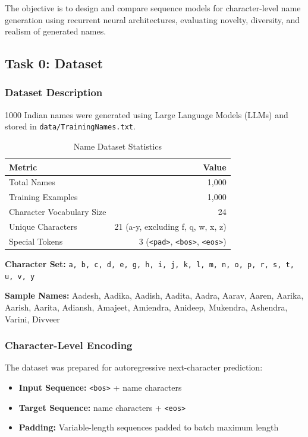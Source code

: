 \documentclass[12pt,a4paper]{article}
\begin{document}
The objective is to design and compare sequence models for character-level name generation using recurrent neural architectures, evaluating novelty, diversity, and realism of generated names.

\subsection{Task 0: Dataset}

\subsubsection{Dataset Description}

1000 Indian names were generated using Large Language Models (LLMs) and stored in \texttt{data/TrainingNames.txt}.

\begin{table}[H]
\centering
\caption{Name Dataset Statistics}
\begin{tabular}{@{}lr@{}}
\toprule
\textbf{Metric} & \textbf{Value} \\
\midrule
Total Names & 1,000 \\
Training Examples & 1,000 \\
Character Vocabulary Size & 24 \\
Unique Characters & 21 (a-y, excluding f, q, w, x, z) \\
Special Tokens & 3 (\texttt{<pad>}, \texttt{<bos>}, \texttt{<eos>}) \\
\bottomrule
\end{tabular}
\end{table}

\textbf{Character Set:}
\texttt{a, b, c, d, e, g, h, i, j, k, l, m, n, o, p, r, s, t, u, v, y}

\textbf{Sample Names:}
Aadesh, Aadika, Aadish, Aadita, Aadra, Aarav, Aaren, Aarika, Aarish, Aarita, Adiansh, Amajeet, Amiendra, Anideep, Mukendra, Ashendra, Varini, Divveer

\subsubsection{Character-Level Encoding}

The dataset was prepared for autoregressive next-character prediction:
\begin{itemize}
    \item \textbf{Input Sequence:} \texttt{<bos>} + name characters
    \item \textbf{Target Sequence:} name characters + \texttt{<eos>}
    \item \textbf{Padding:} Variable-length sequences padded to batch maximum length
\end{itemize}
\end{document}
